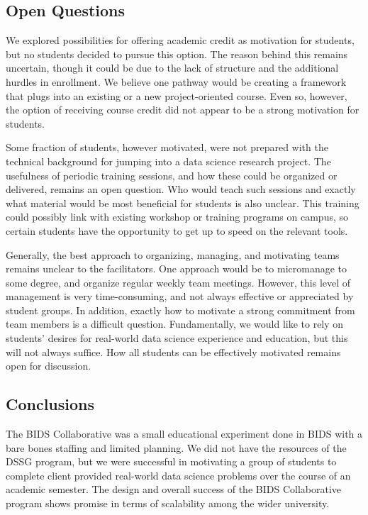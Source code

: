 \documentclass{sig-alternate}
\begin{document}
\subsection{Open Questions}

We explored possibilities for offering academic credit as motivation for students, but no students decided to pursue this option. The reason behind this remains uncertain, though it could be due to the lack of structure and the additional hurdles in enrollment. We believe one pathway would be creating a framework that plugs into an existing or a new project-oriented course.  Even so, however, the option of receiving course credit did not appear to be a strong motivation for students.

Some fraction of students, however motivated, were not prepared with the technical background for jumping into a data science research project.  The usefulness of periodic training sessions, and how these could be organized or delivered, remains an open question.  Who would teach such sessions and exactly what material would be most beneficial for students is also unclear.  This training could possibly link with existing workshop or training programs on campus, so certain students have the opportunity to get up to speed on the relevant tools.

Generally, the best approach to organizing, managing, and motivating teams remains unclear to the facilitators.  One approach would be to micromanage to some degree, and organize regular weekly team meetings.  However, this level of management is very time-consuming, and not always effective or appreciated by student groups.  In addition, exactly how to motivate a strong commitment from team members is a difficult question.  Fundamentally, we would like to rely on students' desires for real-world data science experience and education, but this will not always suffice.  How all students can be effectively motivated remains open for discussion.

\subsection{Conclusions}

The BIDS Collaborative was a small educational experiment done in BIDS with a bare bones staffing and limited planning. We did not have the resources of the DSSG program, but we were successful in motivating a group of students to complete client provided real-world data science problems over the course of an academic semester.  The design and overall success of the BIDS Collaborative program shows promise in terms of scalability among the wider university.
\end{document}
